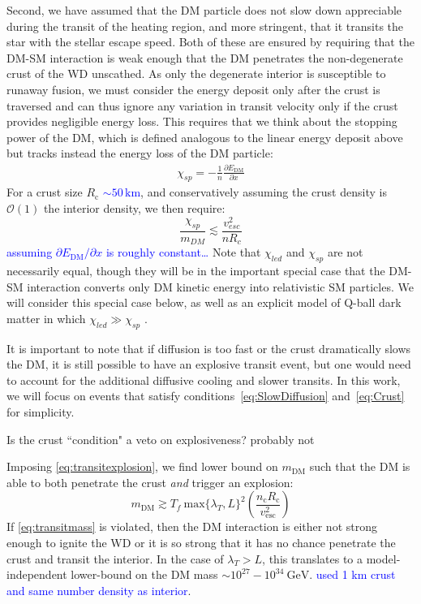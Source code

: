 \documentclass[twocolumn,showpacs,preprintnumbers,amsmath,amssymb,prd]{revtex4}
\newcommand{\OO}{\mathcal{O}}
\newcommand{\GeV}{\text{GeV}}
\def\r{\right)}
\def\l{\left(}
\begin{document}
Second, we have assumed that the DM particle does not slow down appreciable during the transit of the heating region, and more stringent, that it transits the star with the stellar escape speed.  Both of these are ensured by requiring that the DM-SM interaction is weak enough that the DM penetrates the non-degenerate crust of the WD unscathed. As only the degenerate interior is susceptible to runaway fusion, we must consider the energy deposit only after the crust is traversed and can thus ignore any variation in transit velocity only if the crust provides negligible energy loss.  This requires that we think about the stopping power of the DM, which is defined analogous to the linear energy deposit above but tracks instead the energy loss of the DM particle:
\begin{align}
\chi_{sp} = - \frac{1}{n} \frac{\partial{E_{\text{DM}}}}{\partial{x}}
\end{align}
For a crust size $R_{\text{c}}$ \textcolor{blue}{$\sim 50\, \text{km}$}, and conservatively assuming the crust density is $\OO(1)$ the interior density, we then require:
\begin{equation}
\frac{\chi_{sp}}{m_{DM}} \lesssim \frac{v_{esc}^2}{n R_c} \label{eq:Crust}
\end{equation}
\textcolor{blue}{assuming $\partial E_\text{DM}/\partial x$ is roughly constant\ldots}
Note that $\chi_{led}$ and $\chi_{sp}$ are not necessarily equal, though they will be in the important special case that the DM-SM interaction converts only DM kinetic energy into relativistic SM particles. We will consider this special case below, as well as an explicit model of Q-ball dark matter in which $\chi_{led} \gg \chi_{sp}$ .

It is important to note that if diffusion is too fast or the crust dramatically slows the DM, it is still possible to have an explosive transit event, but one would need to account for the additional diffusive cooling and slower transits. In this work, we will focus on events that satisfy conditions~\eqref{eq:SlowDiffusion} and~\eqref{eq:Crust} for simplicity.

{\color{red} Is the crust ``condition" a veto on explosiveness? probably not}

{\color{blue}
Imposing \eqref{eq:transitexplosion}, we find lower bound on $m_{\text{DM}}$ such that the DM is able to both penetrate the crust \emph{and} trigger an explosion:
\begin{equation}
\label{eq:transitmass}
m_{\text{DM}} \gtrsim  T_f ~\text{max}\{\lambda_T, L\}^2 \l \frac{n_{\text{c}} R_{\text{c}}}{v_{\text{esc}}^2} \r
\end{equation}
If \eqref{eq:transitmass} is violated, then the DM interaction is either not strong enough to ignite the WD or it is so strong that it has no chance penetrate the crust and transit the interior. In the case of $\lambda_T > L$, this translates to a model-independent lower-bound on the DM mass $\sim 10^{27} - 10^{34} ~\GeV$. \textcolor{blue}{used 1 km crust and same number density as interior}.
}
\end{document}
